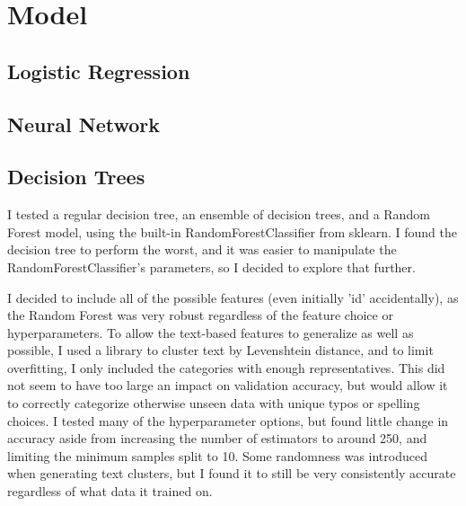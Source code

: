 \section{Model}

\subsection{Logistic Regression}

\subsection{Neural Network}

\subsection{Decision Trees}
I tested a regular decision tree, an ensemble of decision trees, and a Random Forest model, using the built-in RandomForestClassifier from sklearn. I found the decision tree to perform the worst, and it was easier to manipulate the RandomForestClassifier’s parameters, so I decided to explore that further.

I decided to include all of the possible features (even initially 'id' accidentally), as the Random Forest was very robust regardless of the feature choice or hyperparameters. To allow the text-based features to generalize as well as possible, I used a library to cluster text by Levenshtein distance, and to limit overfitting, I only included the categories with enough representatives. This did not seem to have too large an impact on validation accuracy, but would allow it to correctly categorize otherwise unseen data with unique typos or spelling choices.
I tested many of the hyperparameter options, but found little change in accuracy aside from increasing the number of estimators to around 250, and limiting the minimum samples split to 10. Some randomness was introduced when generating text clusters, but I found it to still be very consistently accurate regardless of what data it trained on.


